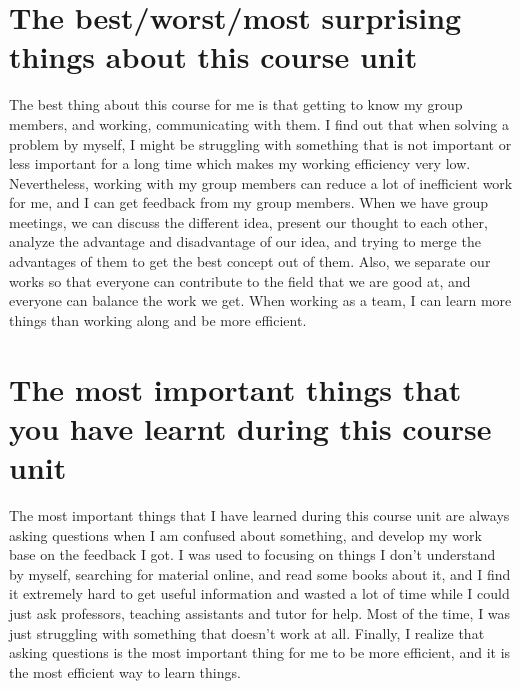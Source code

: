 \documentclass[a4paper]{article}
\begin{document}
\section{The best/worst/most surprising things about this course unit}
The best thing about this course for me is that getting to know my group members, and working, communicating with them. I find out that when solving a problem by myself, I might be struggling with something that is not important or less important for a long time which makes my working efficiency very low. Nevertheless, working with my group members can reduce a lot of inefficient work for me, and I can get feedback from my group members. When we have group meetings, we can discuss the different idea, present our thought to each other, analyze the advantage and disadvantage of our idea, and trying to merge the advantages of them to get the best concept out of them. Also, we separate our works so that everyone can contribute to the field that we are good at, and everyone can balance the work we get. When working as a team, I can learn more things than working along and be more efficient.

\section{The most important things that you have learnt during this course unit}
The most important things that I have learned during this course unit are always asking questions when I am confused about something, and develop my work base on the feedback I got. I was used to focusing on things I don't understand by myself, searching for material online, and read some books about it, and I find it extremely hard to get useful information and wasted a lot of time while I could just ask professors, teaching assistants and tutor for help. Most of the time, I was just struggling with something that doesn't work at all. Finally, I realize that asking questions is the most important thing for me to be more efficient, and it is the most efficient way to learn things.
\end{document}
